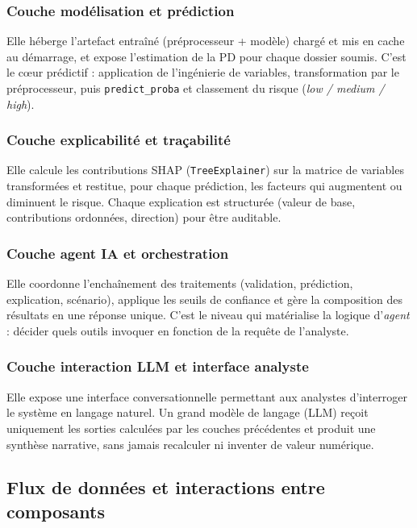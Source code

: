 \documentclass[a4paper,12pt,oneside]{report}
\begin{document}
\subsubsection{Couche modélisation et prédiction}

Elle héberge l'artefact entraîné (préprocesseur + modèle) chargé et mis en cache au
démarrage, et expose l'estimation de la PD pour chaque dossier soumis. C'est le
c\oe ur prédictif : application de l'ingénierie de variables, transformation par le
préprocesseur, puis \texttt{predict\_proba} et classement du risque
(\textit{low / medium / high}).

\subsubsection{Couche explicabilité et traçabilité}

Elle calcule les contributions SHAP (\texttt{TreeExplainer}) sur la matrice
de variables transformées et restitue, pour chaque prédiction, les facteurs qui
augmentent ou diminuent le risque. Chaque explication est structurée (valeur de base,
contributions ordonnées, direction) pour être auditable.

\subsubsection{Couche agent IA et orchestration}

Elle coordonne l'enchaînement des traitements (validation, prédiction, explication,
scénario), applique les seuils de confiance et gère la composition des résultats en
une réponse unique. C'est le niveau qui matérialise la logique d'\textit{agent} :
décider quels outils invoquer en fonction de la requête de l'analyste.

\subsubsection{Couche interaction LLM et interface analyste}

Elle expose une interface conversationnelle permettant aux analystes d'interroger le
système en langage naturel. Un grand modèle de langage (LLM) reçoit uniquement
les sorties calculées par les couches précédentes et produit une synthèse narrative,
sans jamais recalculer ni inventer de valeur numérique.

\subsection{Flux de données et interactions entre composants}
\end{document}

